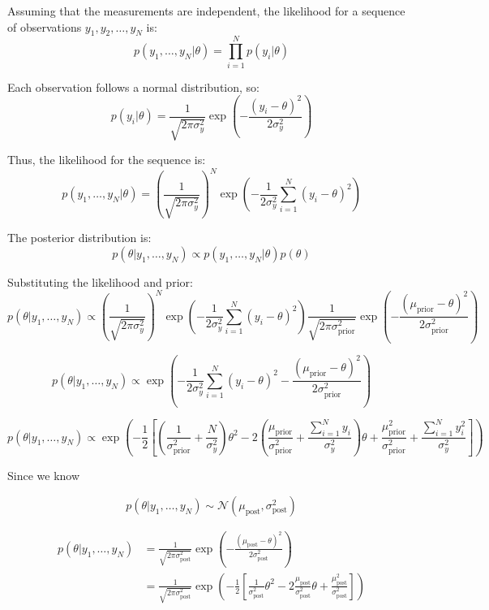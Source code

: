 \documentclass[12pt]{report}
\begin{document}

Assuming that the measurements are independent, the likelihood for a sequence of observations \( y_1, y_2, \ldots, y_N \) is:
\[
p(y_1, \ldots, y_N | \theta) = \prod_{i=1}^{N} p(y_i | \theta)
\]

Each observation follows a normal distribution, so:
\[
p(y_i | \theta) = \frac{1}{\sqrt{2 \pi \sigma_y^2}} \exp \left( -\frac{(y_i - \theta)^2}{2 \sigma_y^2} \right)
\]

Thus, the likelihood for the sequence is:
\[
p(y_1, \ldots, y_N | \theta) = \left( \frac{1}{\sqrt{2 \pi \sigma_y^2}} \right)^N \exp\left( -\frac{1}{2 \sigma_y^2} \sum_{i=1}^{N} (y_i - \theta)^2 \right)
\]


The posterior distribution is:
\[
p(\theta | y_1, \ldots, y_N) \propto p(y_1, \ldots, y_N | \theta) p(\theta)
\]

Substituting the likelihood and prior:
\[
p(\theta | y_1, \ldots, y_N) \propto \left( \frac{1}{\sqrt{2 \pi \sigma_y^2}} \right)^N \exp\left( -\frac{1}{2 \sigma_y^2} \sum_{i=1}^{N} (y_i - \theta)^2 \right)
\frac{1}{\sqrt{2 \pi \sigma_{\text{prior}}^2}} \exp \left( -\frac{(\mu_{\text{prior}} - \theta)^2}{2 \sigma_{\text{prior}}^2} \right)
\]

\[
p(\theta | y_1, \ldots, y_N) \propto  \exp\left( -\frac{1}{2 \sigma_y^2} \sum_{i=1}^{N} (y_i - \theta)^2  -\frac{(\mu_{\text{prior}} - \theta)^2}{2 \sigma_{\text{prior}}^2} \right)
\]


\begin{equation}
p(\theta | y_1, \ldots, y_N) \propto  \exp\left( -\frac{1}{2}    
\left[  
\left( \frac{1}{\sigma_{\text{prior}}^2} + \frac{N}{\sigma_y^2} \right) \theta^2    
- 2 \left( \frac{\mu_{\text{prior}}}{\sigma_{\text{prior}}^2} + \frac{\sum_{i=1}^N y_i}{\sigma_y^2} \right) \theta 
+ \frac{\mu_{\text{prior}}^2}{\sigma_{\text{prior}}^2}+ \frac{\sum_{i=1}^N y_i^2}{\sigma_y^2}
\right] 
\right)    
\end{equation}

Since we know 

\[
p(\theta | y_1, \ldots, y_N) \sim \mathcal{N}(\mu_{\text{post}}, \sigma_{\text{post}}^2)
\]

\begin{align}    
p(\theta | y_1, \ldots, y_N) &= \frac{1}{\sqrt{2 \pi \sigma_{\text{post}}^2}} \exp \left( -\frac{(\mu_{\text{post}} - \theta)^2}{2 \sigma_{\text{post}}^2} \right)
\\
&= \frac{1}{\sqrt{2 \pi \sigma_{\text{post}}^2}} \exp \left( - \frac{1}{2}
\left[
\frac{1}{\sigma_{\text{post}}^2} \theta^2
- 2 \frac{\mu_{\text{post}}}{\sigma_{\text{post}}^2} \theta
+ \frac{\mu_{\text{post}}^2}{\sigma_{\text{post}}^2}
\right] 
\right)
\end{align}
\end{document}
